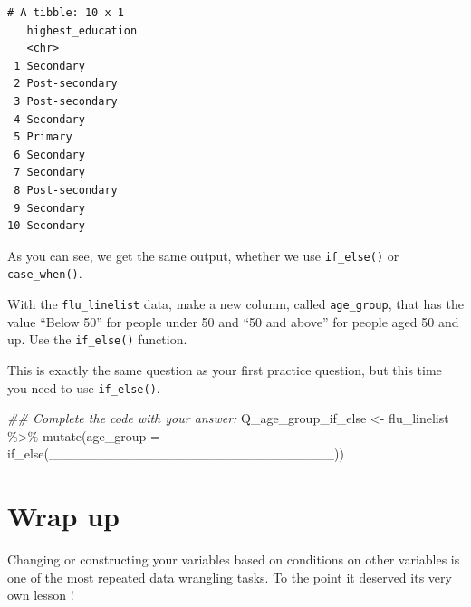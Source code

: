 \documentclass[
  letterpaper,
  DIV=11,
  numbers=noendperiod]{scrreprt}
\newenvironment{Shaded}{\begin{snugshade}}{\end{snugshade}}
\newcommand{\AttributeTok}[1]{\textcolor[rgb]{0.40,0.45,0.13}{#1}}
\newcommand{\DocumentationTok}[1]{\textcolor[rgb]{0.37,0.37,0.37}{\textit{#1}}}
\newcommand{\FunctionTok}[1]{\textcolor[rgb]{0.28,0.35,0.67}{#1}}
\newcommand{\NormalTok}[1]{\textcolor[rgb]{0.00,0.23,0.31}{#1}}
\newcommand{\OtherTok}[1]{\textcolor[rgb]{0.00,0.23,0.31}{#1}}
\newcommand{\SpecialCharTok}[1]{\textcolor[rgb]{0.37,0.37,0.37}{#1}}
\begin{document}
\begin{verbatim}
# A tibble: 10 x 1
   highest_education
   <chr>            
 1 Secondary        
 2 Post-secondary   
 3 Post-secondary   
 4 Secondary        
 5 Primary          
 6 Secondary        
 7 Secondary        
 8 Post-secondary   
 9 Secondary        
10 Secondary        
\end{verbatim}

As you can see, we get the same output, whether we use
\texttt{if\_else()} or \texttt{case\_when()}.

\begin{tcolorbox}[enhanced jigsaw, titlerule=0mm, colback=white, left=2mm, breakable, opacitybacktitle=0.6, colbacktitle=quarto-callout-tip-color!10!white, colframe=quarto-callout-tip-color-frame, bottomtitle=1mm, opacityback=0, coltitle=black, arc=.35mm, toptitle=1mm, title=\textcolor{quarto-callout-tip-color}{\faLightbulb}\hspace{0.5em}{Practice}, leftrule=.75mm, toprule=.15mm, bottomrule=.15mm, rightrule=.15mm]

With the \texttt{flu\_linelist} data, make a new column, called
\texttt{age\_group}, that has the value ``Below 50'' for people under 50
and ``50 and above'' for people aged 50 and up. Use the
\texttt{if\_else()} function.

This is exactly the same question as your first practice question, but
this time you need to use \texttt{if\_else()}.

\begin{Shaded}
\begin{Highlighting}[]
\DocumentationTok{\#\# Complete the code with your answer:}
\NormalTok{Q\_age\_group\_if\_else }\OtherTok{\textless{}{-}} 
\NormalTok{  flu\_linelist }\SpecialCharTok{\%\textgreater{}\%} 
  \FunctionTok{mutate}\NormalTok{(}\AttributeTok{age\_group =} \FunctionTok{if\_else}\NormalTok{(\_\_\_\_\_\_\_\_\_\_\_\_\_\_\_\_\_\_\_\_\_\_\_\_\_\_\_\_\_\_))}
\end{Highlighting}
\end{Shaded}

\end{tcolorbox}

\section{Wrap up}\label{wrap-up-5}

Changing or constructing your variables based on conditions on other
variables is one of the most repeated data wrangling tasks. To the point
it deserved its very own lesson !
\end{document}
